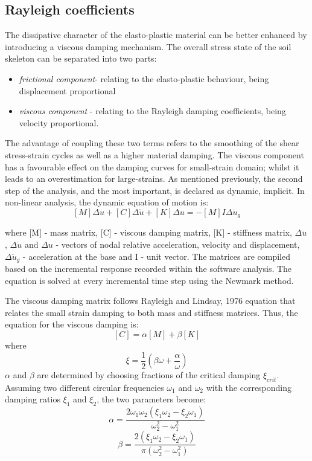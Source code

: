 	\subsection{Rayleigh coefficients}
	The dissipative character of the elasto-plastic material can be better enhanced by introducing a viscous damping mechanism. The overall stress state of the soil skeleton can be separated into two parts: 
	\begin{itemize}
		\item \textit{frictional component}- relating to the elasto-plastic behaviour, being displacement proportional
		\item \textit{viscous component} - relating to the Rayleigh damping coefficients, being velocity proportional. 
	\end{itemize}
	
	The advantage of coupling these two terms refers to the smoothing of the shear stress-strain cycles as well as a higher material damping. The viscous component has a favourable effect on the damping curves for small-strain domain; whilst it leads to an overestimation for large-strains. 
	As mentioned previously, the second step of the analysis, and the most important, is declared as dynamic, implicit. In non-linear analysis, the dynamic equation of motion is:
	\begin{equation}
	\left[M\right]{\Delta \ddot{u}}+\left[C\right]{\Delta \dot{u}}+\left[K\right]\Delta{u}=-\left[M\right]{I}\Delta\ddot{u}_g
	\end{equation}
	
	where [M] - mass matrix, [C] - viscous damping matrix, [K] - stiffness matrix, $\Delta \ddot{u}$, $\Delta \dot{u}$ and $\Delta{u}$ - vectors of nodal relative acceleration, velocity and displacement, $\Delta \ddot{u}_g$ - acceleration at the base and {I} - unit vector. The matrices are compiled based on the incremental response recorded within the software analysis. The equation is solved at every incremental time step using the Newmark \cite{newmark1959method} method.
	
	The viscous damping matrix follows Rayleigh and Lindsay, 1976 \cite{rayleigh1976theory} equation that relates the small strain damping to both mass and stiffness matrices. Thus, the equation for the viscous damping is:
	\begin{equation}
	\left[C\right]=\alpha\left[M\right]+\beta\left[K\right]
	\end{equation}
	where 
	\begin{equation}
		\xi = \frac{1}{2}(\beta \omega + \frac{\alpha}{\omega})
	\end{equation}
	$\alpha$ and $\beta$ are determined by choosing fractions of the critical damping $\xi_{crit}$. Assuming two different circular frequencies $\omega_1$ and $\omega_2$ with the corresponding damping ratios $\xi_1$ and $\xi_2$, the two parameters become:
	\begin{equation}
		\alpha=\frac{2 \omega_1 \omega_2 (\xi_1 \omega_2 - \xi_2 \omega_1)}{\omega_2^2 - \omega_1^2}
	\end{equation}
	\begin{equation}
		\beta=\frac{2 (\xi_1 \omega_2 - \xi_2 \omega_1)}{\pi (\omega_2^2 - \omega_1^2)}
	\end{equation}
	
